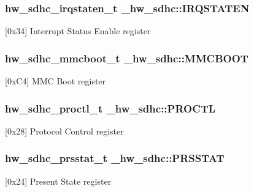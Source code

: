 \subsubsection[{\texorpdfstring{I\+R\+Q\+S\+T\+A\+T\+EN}{IRQSTATEN}}]{ {\bf hw\+\_\+sdhc\+\_\+irqstaten\+\_\+t} \+\_\+hw\+\_\+sdhc\+::\+I\+R\+Q\+S\+T\+A\+T\+EN}\hypertarget{struct__hw__sdhc_a3608bd4dfd8edfa327c65b2b314f9af6}{}\label{struct__hw__sdhc_a3608bd4dfd8edfa327c65b2b314f9af6}
\mbox{[}0x34\mbox{]} Interrupt Status Enable register 
\subsubsection[{\texorpdfstring{M\+M\+C\+B\+O\+OT}{MMCBOOT}}]{ {\bf hw\+\_\+sdhc\+\_\+mmcboot\+\_\+t} \+\_\+hw\+\_\+sdhc\+::\+M\+M\+C\+B\+O\+OT}\hypertarget{struct__hw__sdhc_a4fee222eba57b75453e67aa328f6546f}{}\label{struct__hw__sdhc_a4fee222eba57b75453e67aa328f6546f}
\mbox{[}0x\+C4\mbox{]} M\+MC Boot register 
\subsubsection[{\texorpdfstring{P\+R\+O\+C\+TL}{PROCTL}}]{ {\bf hw\+\_\+sdhc\+\_\+proctl\+\_\+t} \+\_\+hw\+\_\+sdhc\+::\+P\+R\+O\+C\+TL}\hypertarget{struct__hw__sdhc_adba2937d5860a712dd8ebc48bbfbc764}{}\label{struct__hw__sdhc_adba2937d5860a712dd8ebc48bbfbc764}
\mbox{[}0x28\mbox{]} Protocol Control register 
\subsubsection[{\texorpdfstring{P\+R\+S\+S\+T\+AT}{PRSSTAT}}]{ {\bf hw\+\_\+sdhc\+\_\+prsstat\+\_\+t} \+\_\+hw\+\_\+sdhc\+::\+P\+R\+S\+S\+T\+AT}\hypertarget{struct__hw__sdhc_a9029af1b1f4bffc85e08d25d4c3c5e83}{}\label{struct__hw__sdhc_a9029af1b1f4bffc85e08d25d4c3c5e83}
\mbox{[}0x24\mbox{]} Present State register 
